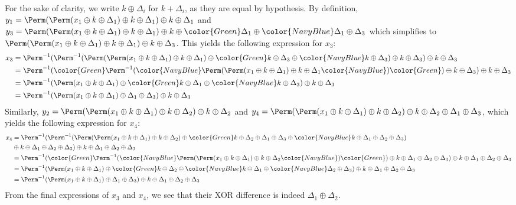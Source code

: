For the sake of clarity, we write $k \oplus \Delta_i$ for $k + \Delta_i$, as they are equal by hypothesis. 
By definition,
$y_1 = \Perm(\Perm(x_1 \oplus k \oplus \Delta_1) \oplus k \oplus \Delta_1) \oplus k \oplus \Delta_1$ and
$y_3 = \Perm(\Perm(x_1 \oplus k \oplus \Delta_1) \oplus k \oplus \Delta_1) \oplus k \oplus {\color{Green}\Delta_1} \oplus {\color{NavyBlue}\Delta_1} \oplus \Delta_3$
which simplifies to 
$\Perm(\Perm(x_1 \oplus k \oplus \Delta_1) \oplus k \oplus \Delta_1) \oplus k \oplus \Delta_3$. This yields the following
expression for $x_3$:
\begin{align*}
x_3 &= \Perm^{-1}(\Perm^{-1}(\Perm(\Perm(x_1 \oplus k \oplus \Delta_1) \oplus k \oplus \Delta_1) \oplus {\color{Green}k \oplus \Delta_3} \oplus {\color{NavyBlue}k \oplus \Delta_3})
\oplus k \oplus \Delta_3) \oplus k \oplus \Delta_3 \\
&= \Perm^{-1}({\color{Green}\Perm^{-1}(}{\color{NavyBlue}\Perm(}\Perm(x_1 \oplus k \oplus \Delta_1) \oplus k \oplus \Delta_1{\color{NavyBlue})}{\color{Green})}
\oplus k \oplus \Delta_3) \oplus k \oplus \Delta_3 \\
&= \Perm^{-1}(\Perm(x_1 \oplus k \oplus \Delta_1) \oplus {\color{Green}k} \oplus \Delta_1 \oplus {\color{NavyBlue}k} \oplus \Delta_3) \oplus k \oplus \Delta_3 \\
&= \Perm^{-1}(\Perm(x_1 \oplus k \oplus \Delta_1) \oplus \Delta_1 \oplus \Delta_3) \oplus k \oplus \Delta_3
\end{align*}
Similarly,
$y_2 = \Perm(\Perm(x_1 \oplus k \oplus \Delta_1) \oplus k \oplus \Delta_2) \oplus k \oplus \Delta_2$ and
$y_4 = \Perm(\Perm(x_1 \oplus k \oplus \Delta_1) \oplus k \oplus \Delta_2) \oplus k \oplus \Delta_2 \oplus \Delta_1 \oplus \Delta_3$, which
yields the following expression for $x_4$:
\begin{align*}
x_4 &=  \Perm^{-1}(\Perm^{-1}(\Perm(\Perm(x_1 \oplus k \oplus \Delta_1) \oplus k \oplus \Delta_2) \oplus {\color{Green}k \oplus \Delta_2 \oplus \Delta_1
\oplus \Delta_3} \oplus {\color{NavyBlue}k \oplus \Delta_1 \oplus \Delta_2 \oplus \Delta_3}) \\
&\oplus k \oplus \Delta_1 \oplus \Delta_2 \oplus \Delta_3) \oplus k \oplus \Delta_1 \oplus \Delta_2 \oplus \Delta_3\\
&= \Perm^{-1}({\color{Green}\Perm^{-1}(}{\color{NavyBlue}\Perm(}\Perm(x_1 \oplus k \oplus \Delta_1) \oplus k \oplus \Delta_2{\color{NavyBlue})}{\color{Green})}
\oplus k \oplus \Delta_1 \oplus \Delta_2
\oplus \Delta_3) \oplus k \oplus \Delta_1 \oplus \Delta_2 \oplus \Delta_3 \\
&= \Perm^{-1}(\Perm(x_1 \oplus k \oplus \Delta_1) \oplus {\color{Green}k \oplus \Delta_2} \oplus {\color{NavyBlue}k} \oplus \Delta_1 \oplus {\color{NavyBlue}\Delta_2} \oplus
\Delta_3) \oplus k \oplus \Delta_1 \oplus \Delta_2 \oplus \Delta_3\\
&= \Perm^{-1}(\Perm(x_1 \oplus k \oplus \Delta_1) \oplus \Delta_1 \oplus \Delta_3) \oplus k \oplus \Delta_1 \oplus \Delta_2 \oplus \Delta_3
\end{align*}
From the final expressions of $x_3$ and $x_4$, we see that their XOR difference is indeed $\Delta_1 \oplus \Delta_2$.

